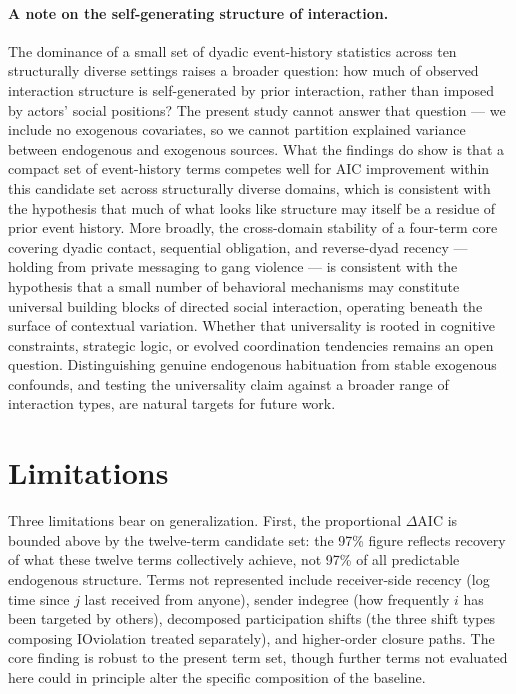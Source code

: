\documentclass[11pt]{article}
\begin{document}
\paragraph{A note on the self-generating structure of interaction.}
The dominance of a small set of dyadic event-history statistics across ten
structurally diverse settings raises a broader question: how much of observed
interaction structure is self-generated by prior interaction, rather than imposed
by actors' social positions? The present study cannot answer that question ---
we include no exogenous covariates, so we cannot partition explained variance
between endogenous and exogenous sources. What the findings do show is that
a compact set of event-history terms competes well for AIC improvement within
this candidate set across structurally diverse domains, which is consistent with
the hypothesis that much of what looks like structure may itself be a residue of
prior event history. More broadly, the cross-domain
stability of a four-term core covering dyadic contact, sequential obligation,
and reverse-dyad recency --- holding from private messaging to gang violence ---
is consistent with the hypothesis that a small number of behavioral mechanisms
may constitute universal building blocks of directed social interaction, operating
beneath the surface of contextual variation. Whether that universality is rooted
in cognitive constraints, strategic logic, or evolved coordination tendencies
remains an open question. Distinguishing genuine endogenous habituation from
stable exogenous confounds, and testing the universality claim against a broader
range of interaction types, are natural targets for future work.

\section{Limitations}

Three limitations bear on generalization. First, the
proportional $\Delta$AIC is bounded above by the twelve-term candidate set: the
97\% figure reflects recovery of what these twelve terms collectively achieve,
not 97\% of all predictable endogenous structure. Terms not represented include
receiver-side recency (log time since $j$ last received from anyone), sender
indegree (how frequently $i$ has been targeted by others), decomposed
participation shifts (the three shift types composing IOviolation treated
separately), and higher-order closure paths. The core finding is robust to
the present term set, though further terms not evaluated here could in principle
alter the specific composition of the baseline.
\end{document}
